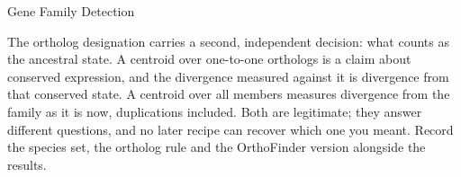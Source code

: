 \begin{recipe}[label=sub:gene-family-detection]{Gene Family Detection}
\begin{interpretation}
  The ortholog designation carries a second, independent decision: what counts
  as the ancestral state. A centroid over one-to-one orthologs is a claim about
  conserved expression, and the divergence measured against it is divergence
  from that conserved state. A centroid over all members measures divergence
  from the family as it is now, duplications included. Both are legitimate;
  they answer different questions, and no later recipe can recover which one
  you meant. Record the species set, the ortholog rule and the OrthoFinder
  version alongside the results.
\end{interpretation}

\begin{references}
\end{references}

\end{recipe}

